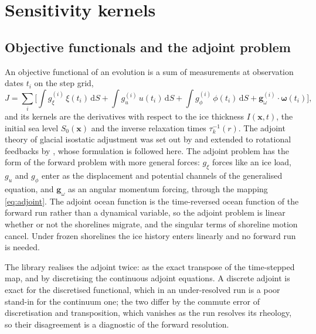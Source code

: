 \documentclass[11pt,a4paper]{article}
\newcommand{\dd}{\mathrm{d}}
\newcommand{\x}{\mathbf{x}}
\numberwithin{equation}{section}
\begin{document}
\section{Sensitivity kernels}
\label{sec:kernels}

\subsection{Objective functionals and the adjoint problem}

An objective functional of an evolution is a sum of measurements at
observation dates $t_{i}$ on the step grid,
\begin{equation}
J = \sum_{i}\Big[\int g^{(i)}_{\xi}\,\xi(t_{i})\,\dd S
 + \int g^{(i)}_{u}\,u(t_{i})\,\dd S
 + \int g^{(i)}_{\phi}\,\phi(t_{i})\,\dd S
 + \mathbf{g}^{(i)}_{\omega}\cdot\bm{\omega}(t_{i})\Big],
\label{eq:objective}
\end{equation}
and its kernels are the derivatives with respect to the ice thickness
$I(\x,t)$, the initial sea level $S_{0}(\x)$ and the inverse relaxation times
$\tau_{k}^{-1}(r)$. The adjoint theory of glacial isostatic adjustment was set
out by \citet{CrawfordEtAl2018} and extended to rotational feedbacks by
\citet{YuEtAl2025}, whose formulation is followed here. The adjoint problem has
the form of the forward problem with more general forces: $g_{\xi}$ forces like an
ice load, $g_{u}$ and $g_{\phi}$ enter as the displacement and potential
channels of the generalised equation, and $\mathbf{g}_{\omega}$ as an angular
momentum forcing, through the mapping \eqref{eq:adjoint}. The adjoint ocean
function is the time-reversed ocean function of the forward run rather than a
dynamical variable, so the adjoint problem is linear whether or not the
shorelines migrate, and the singular terms of shoreline motion cancel. Under
frozen shorelines the ice history enters linearly and no forward run is needed.

The library realises the adjoint twice: as the exact transpose of the
time-stepped map, and by discretising the continuous adjoint equations. A
discrete adjoint is exact for the discretised functional, which in an
under-resolved run is a poor stand-in for the continuum one; the two differ by
the commute error of discretisation and transposition, which vanishes as the
run resolves its rheology, so their disagreement is a diagnostic of the forward
resolution.
\end{document}
